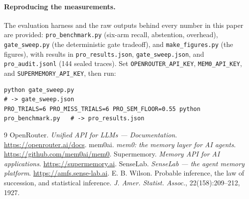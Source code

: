 \documentclass[11pt]{article}
\begin{document}
\paragraph{Reproducing the measurements.} The evaluation harness and the raw outputs behind every
number in this paper are provided: \texttt{pro\_benchmark.py} (six-arm recall, abstention, overhead),
\texttt{gate\_sweep.py} (the deterministic gate tradeoff), and \texttt{make\_figures.py} (the
figures), with results in \texttt{pro\_results.json}, \texttt{gate\_sweep.json}, and
\texttt{pro\_audit.jsonl} (144 sealed traces). Set \texttt{OPENROUTER\_API\_KEY},
\texttt{MEM0\_API\_KEY}, and \texttt{SUPERMEMORY\_API\_KEY}, then run:

\begin{lstlisting}[style=trace]
python gate_sweep.py                                                       # -> gate_sweep.json
PRO_TRIALS=6 PRO_MISS_TRIALS=6 PRO_SEM_FLOOR=0.55 python pro_benchmark.py   # -> pro_results.json
\end{lstlisting}

\begin{thebibliography}{9}
 OpenRouter. \emph{Unified API for LLMs --- Documentation}.
  \url{https://openrouter.ai/docs}.
 mem0ai. \emph{mem0: the memory layer for AI agents}.
  \url{https://github.com/mem0ai/mem0}.
 Supermemory. \emph{Memory API for AI applications}.
  \url{https://supermemory.ai}.
 SenseLab. \emph{SenseLab --- the agent memory platform}.
  \url{https://amfs.sense-lab.ai}.
 E. B. Wilson. Probable inference, the law of succession, and statistical
  inference. \emph{J. Amer. Statist. Assoc.}, 22(158):209--212, 1927.
\end{thebibliography}
\end{document}
